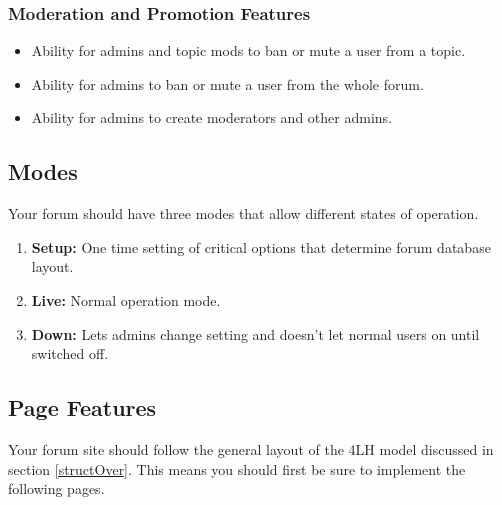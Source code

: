 \documentclass[]{article}
\begin{document}
\subsubsection{Moderation and Promotion Features}
\begin{itemize}
    \item Ability for admins and topic mods to ban or mute a user from a topic.
    \item Ability for admins to ban or mute a user from the whole forum.
    \item Ability for admins to create moderators and other admins.
\end{itemize}

\subsection{Modes}
Your forum should have three modes that allow different states of operation. 
\begin{enumerate}
    \item \textbf{Setup:} One time setting of critical options that determine forum database layout.
    \item \textbf{Live:} Normal operation mode. 
    \item \textbf{Down:} Lets admins change setting and doesn't let normal users on until switched off.
\end{enumerate}

\subsection{Page Features}
Your forum site should follow the general layout of the 4LH model discussed in section \ref{structOver}. This means you should first be sure to implement the following pages.
\end{document}
